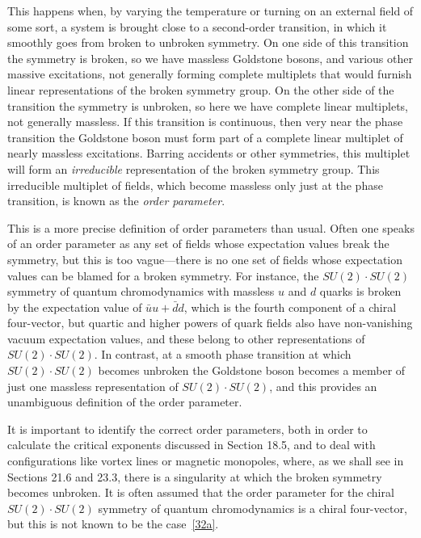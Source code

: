 This happens when, by varying the temperature or turning on an external field of some sort, a system is brought close to a second-order transition, in which it smoothly goes from broken to unbroken symmetry. On one side of this transition the symmetry is broken, so we have massless Goldstone bosons, and various other massive excitations, not generally forming complete multiplets that would furnish linear representations of the broken symmetry group. On the other side of the transition the symmetry is unbroken, so here we have complete linear multiplets, not generally massless. If this transition is continuous, then very near the phase transition the Goldstone boson must form part of a complete linear multiplet of nearly massless excitations. Barring accidents or other symmetries, this multiplet will form an \emph{irreducible} representation of the broken symmetry group. This irreducible multiplet of fields, which become massless only just at the phase transition, is known as the \emph{order parameter}.

This is a more precise definition of order parameters than usual. Often one speaks of an order parameter as any set of fields whose expectation values break the symmetry, but this is too vague---there is no one set of fields whose expectation values can be blamed for a broken symmetry. For instance, the $SU(2)\cdot SU(2)$ symmetry of quantum chromodynamics with massless $u$ and $d$ quarks is broken by the expectation value of $\bar uu+\bar dd$, which is the fourth component of a chiral four-vector, but quartic and higher powers of quark fields also have non-vanishing vacuum expectation values, and these belong to other representations of $SU(2)\cdot SU(2)$. In contrast, at a smooth phase transition at which $SU(2)\cdot SU(2)$ becomes unbroken the Goldstone boson becomes a member of just one massless representation of $SU(2)\cdot SU(2)$, and this provides an unambiguous definition of the order parameter.

It is important to identify the correct order parameters, both in order to calculate the critical exponents discussed in Section 18.5, and to deal with configurations like vortex lines or magnetic monopoles, where, as we shall see in Sections 21.6 and 23.3, there is a singularity at which the broken symmetry becomes unbroken. It is often assumed that the order parameter for the chiral $SU(2)\cdot SU(2)$ symmetry of quantum chromodynamics is a chiral four-vector, but this is not known to be the case~\hyperref[ch19-ref-32a]{[32a]}.
